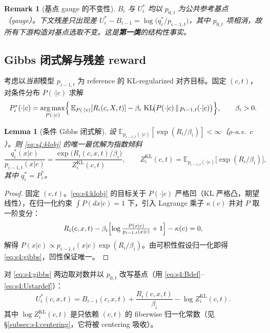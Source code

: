 \documentclass[11pt,a4paper]{article}
\newtheorem{lemma}[theorem]{Lemma}
\newtheorem{remark}[theorem]{Remark}
\DeclareMathOperator{\KL}{KL}
\DeclareMathOperator*{\argmax}{arg\,max}
\newcommand{\E}{\mathbb{E}}
\begin{document}
\begin{remark}[基点 gauge 的不变性]\label{rem:s4:gauge}
$B_i$ 与 $U_i^*$ 均以 $p_{0,t}$ 为公共参考基点（gauge）。下文残差只出现差 $U_i^*-B_{i-1}=\log\bigl(q_i^*/p_{i-1,t}\bigr)$，其中 $p_{0,t}$ 项相消，故所有下游构造对基点选取不变。这是\textbf{第一类}的结构性事实。
\end{remark}

\subsection{Gibbs 闭式解与残差 reward}

考虑以\emph{当前}模型 $p_{i-1,t}$ 为 reference 的 KL-regularized 对齐目标。固定 $(c,t)$，对条件分布 $P(\cdot|c)$ 求解
\begin{equation}\label{eq:s4:klobj}
P_i^*(\cdot|c)=\argmax_{P(\cdot|c)}\Bigl\{\,\E_{P(\cdot|c)}[R_i(c,X,t)]-\beta_i\,\KL\!\bigl(P(\cdot|c)\,\|\,p_{i-1,t}(\cdot|c)\bigr)\Bigr\},\qquad \beta_i>0 .
\end{equation}

\begin{lemma}[条件 Gibbs 闭式解]\label{lem:s4:gibbs}
设 $\E_{p_{i-1,t}(\cdot|c)}[\exp(R_i/\beta_i)]<\infty$（$\rho$-a.e.\ $c$）。则 \eqref{eq:s4:klobj} 的唯一最优解为指数倾斜
\begin{equation}\label{eq:s4:gibbs}
\frac{q_i^*(x|c)}{p_{i-1,t}(x|c)}=\frac{\exp\!\bigl(R_i(c,x,t)/\beta_i\bigr)}{Z_i^{\mathrm{KL}}(c,t)},\qquad
Z_i^{\mathrm{KL}}(c,t)=\E_{p_{i-1,t}(\cdot|c)}\!\bigl[\exp(R_i/\beta_i)\bigr],
\end{equation}
其中 $q_i^*=P_i^*$。
\end{lemma}

\begin{proof}
固定 $(c,t)$。\eqref{eq:s4:klobj} 的目标关于 $P(\cdot|c)$ 严格凹（KL 严格凸，期望线性），在归一化约束 $\int P(dx|c)=1$ 下，引入 Lagrange 乘子 $\kappa(c)$ 并对 $P$ 取一阶变分：
\[
R_i(c,x,t)-\beta_i\Bigl[\log\tfrac{P(x|c)}{p_{i-1,t}(x|c)}+1\Bigr]-\kappa(c)=0 ,
\]
解得 $P(x|c)\propto p_{i-1,t}(x|c)\exp(R_i/\beta_i)$。由可积性假设归一化即得 \eqref{eq:s4:gibbs}，凹性保证唯一。
\end{proof}

对 \eqref{eq:s4:gibbs} 两边取对数并以 $p_{0,t}$ 改写基点（用 \eqref{eq:s4:Bdef}--\eqref{eq:s4:Ustardef}）：
\begin{equation}\label{eq:s4:gibbslog}
U_i^*(c,x,t)=B_{i-1}(c,x,t)+\frac{R_i(c,x,t)}{\beta_i}-\log Z_i^{\mathrm{KL}}(c,t).
\end{equation}
其中 $\log Z_i^{\mathrm{KL}}(c,t)$ 是只依赖 $(c,t)$ 的 fiberwise 归一化常数（见 \S\ref{subsec:s4:centering}，它将被 centering 吸收）。
\end{document}
